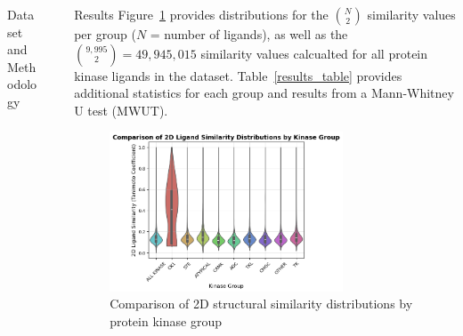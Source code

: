 \documentclass[final]{beamer}
\newlength{\sepwidth}
\newlength{\colwidth}
\newcommand{\separatorcolumn}{\begin{column}{\sepwidth}\end{column}}
\begin{document}
\begin{frame}[t]
\begin{columns}[t]
\begin{column}{\colwidth}
\begin{block}{Dataset and Methodology}
 

  \end{block}
\end{column}

\separatorcolumn

\begin{column}{\colwidth}

  \begin{block}{Results}
    \small
    Figure~\ref{violin_plot} provides distributions for the ${N\choose 2}$ similarity values per group ($N$ = number of ligands), as well as the ${9,995 \choose 2} = 49,945,015$ similarity values calcualted for all protein kinase ligands in the dataset. Table~\ref{results_table} provides additional statistics for each group and results from a Mann-Whitney U test (MWUT).
    \begin{figure}
        \centering
        \includegraphics[width=0.75\textwidth]{../figures/violin_plot.png}
        \caption{Comparison of 2D structural similarity distributions by protein kinase group}
        \label{violin_plot}
    \end{figure}
    

\end{block}
\end{column}
\end{columns}
\end{frame}
\end{document}
